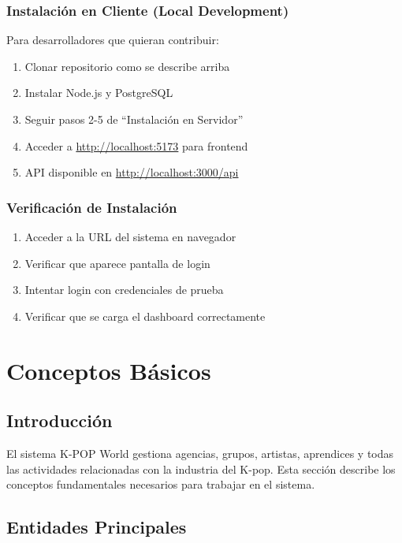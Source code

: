 \documentclass[12pt,a4paper,spanish,oneside]{report}
\begin{document}
\subsection{Instalación en Cliente (Local Development)}

Para desarrolladores que quieran contribuir:

\begin{enumerate}
    \item Clonar repositorio como se describe arriba
    \item Instalar Node.js y PostgreSQL
    \item Seguir pasos 2-5 de ``Instalación en Servidor''
    \item Acceder a \url{http://localhost:5173} para frontend
    \item API disponible en \url{http://localhost:3000/api}
\end{enumerate}

\subsection{Verificación de Instalación}

\begin{enumerate}
    \item Acceder a la URL del sistema en navegador
    \item Verificar que aparece pantalla de login
    \item Intentar login con credenciales de prueba
    \item Verificar que se carga el dashboard correctamente
\end{enumerate}

\chapter{Conceptos Básicos}

\section{Introducción}

El sistema K-POP World gestiona agencias, grupos, artistas, aprendices y todas las actividades relacionadas con la industria del K-pop. Esta sección describe los conceptos fundamentales necesarios para trabajar en el sistema.

\section{Entidades Principales}
\end{document}
